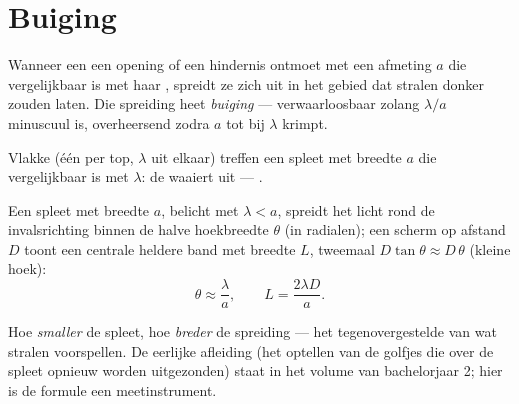 \section{Buiging}

\begin{definition}[Buiging]\label{def:g12:light-as-wave:diffraction}
Wanneer een  een opening of een hindernis ontmoet met een afmeting $a$
die vergelijkbaar is met haar , spreidt ze zich uit in het
gebied dat stralen donker zouden laten. Die spreiding heet
\emph{buiging} --- verwaarloosbaar zolang $\lambda/a$
minuscuul is, overheersend zodra $a$ tot bij $\lambda$ krimpt.
\end{definition}

\begin{omfigure}

{\small Vlakke  (één per top, $\lambda$ uit elkaar) treffen een
spleet met breedte $a$ die vergelijkbaar is met $\lambda$: de 
waaiert uit --- .}
\end{omfigure}

\begin{proposition}\label{prop:g12:light-as-wave:halfwidth}
Een spleet met breedte $a$, belicht met  $\lambda < a$, spreidt
het licht rond de invalsrichting binnen de halve hoekbreedte $\theta$ (in
radialen); een scherm op afstand $D$ toont een centrale heldere band met
breedte $L$, tweemaal $D \tan\theta \approx D\,\theta$ (kleine hoek):
\[
\theta \approx \frac{\lambda}{a}, \qquad L = \frac{2\lambda D}{a}.
\]
\end{proposition}
\admitted

\begin{remark}\label{rem:g12:light-as-wave:honest}
Hoe \emph{smaller} de spleet, hoe \emph{breder} de spreiding --- het
tegenovergestelde van wat stralen voorspellen. De eerlijke afleiding (het
optellen van de golfjes die over de spleet opnieuw worden uitgezonden)
staat in het volume van bachelorjaar 2; hier is de formule een
meetinstrument.
\end{remark}

